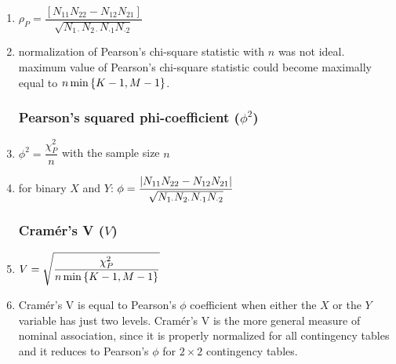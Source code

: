 \begin{enumerate}
    \item $\rho_P = \dfrac{[N_{11} N_{22} - N_{12} N_{21}]}{\sqrt{N_{1\cdot } N_{2\cdot } N_{\cdot 1} N_{\cdot 2}}}$
    \hfill \cite{statistics/book/Statistics-for-Data-Scientists/Maurits-Kaptein}

    \item normalization of Pearson’s chi-square statistic with $n$ was not ideal. 
    maximum value of Pearson’s chi-square statistic could become maximally equal to $n \min\left\{K - 1, M - 1\right\}$.
    \hfill \cite{statistics/book/Statistics-for-Data-Scientists/Maurits-Kaptein}


\subsubsection{Pearson’s squared phi-coefficient ($\phi^2$)}

    \item $\phi^2 = \dfrac{\chi_P^2}{n}$ with the sample size $n$
    \hfill \cite{statistics/book/Statistics-for-Data-Scientists/Maurits-Kaptein}

    \item for binary $X$ and $Y $:
    $
        \phi = \dfrac{\left| N_{11} N_{22} - N_{12} N_{21} \right|}{\sqrt{N_{1\cdot } N_{2\cdot } N_{\cdot 1} N_{\cdot 2}}}
    $
    \hfill \cite{statistics/book/Statistics-for-Data-Scientists/Maurits-Kaptein}


\subsubsection{Cramér’s V ($V$)}

    \item $V = \sqrt{\dfrac{\chi^2_P}{n \min\left\{K - 1, M - 1\right\}}}$
    \hfill \cite{statistics/book/Statistics-for-Data-Scientists/Maurits-Kaptein}

    \item Cramér’s V is equal to Pearson’s $\phi$ coefficient when either the $X$ or the $Y$ variable has just two levels. 
    Cramér’s V is the more general measure of nominal association, since it is properly normalized for all contingency tables and it reduces to Pearson’s $\phi$ for $2 \times 2$ contingency tables.
    \hfill \cite{statistics/book/Statistics-for-Data-Scientists/Maurits-Kaptein}
\end{enumerate}











